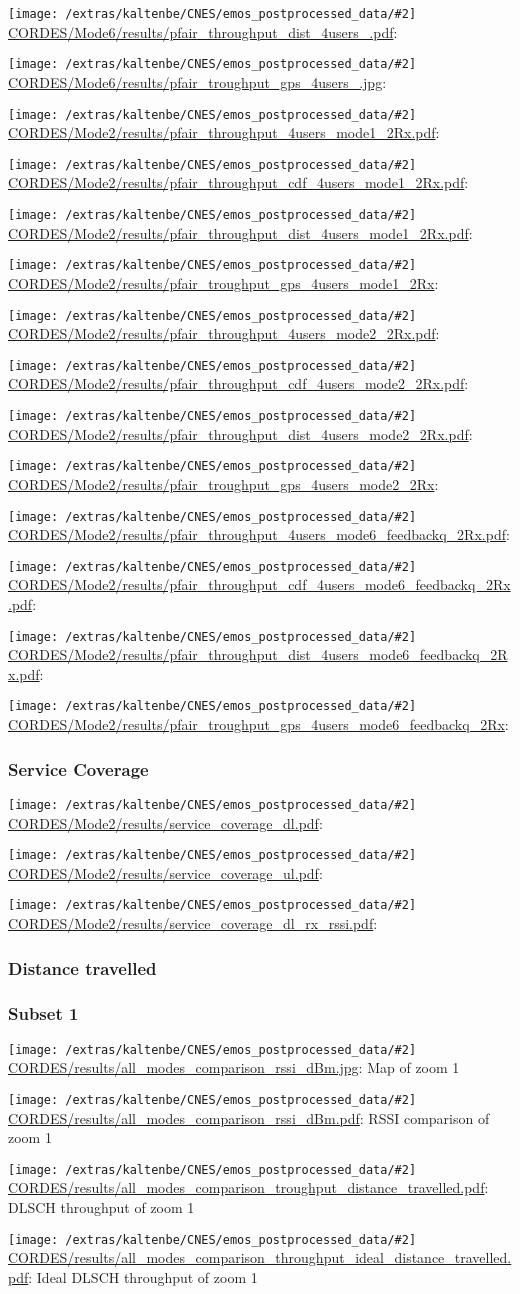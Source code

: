 \documentclass[a4paper,10pt]{article}
\newcommand{\printfile}[2][]{
 \begin{minipage}{8cm}
  \centering
  \texttt{[image: /extras/kaltenbe/CNES/emos\_postprocessed\_data/\#2]}
  \url{#2}: #1

 \end{minipage}
}
\begin{document}
\printfile{CORDES/Mode6/results/pfair_throughput_dist_4users_.pdf}
\printfile{CORDES/Mode6/results/pfair_troughput_gps_4users_.jpg}

\printfile{CORDES/Mode2/results/pfair_throughput_4users_mode1_2Rx.pdf}
\printfile{CORDES/Mode2/results/pfair_throughput_cdf_4users_mode1_2Rx.pdf}

\printfile{CORDES/Mode2/results/pfair_throughput_dist_4users_mode1_2Rx.pdf}
\printfile{CORDES/Mode2/results/pfair_troughput_gps_4users_mode1_2Rx}

\printfile{CORDES/Mode2/results/pfair_throughput_4users_mode2_2Rx.pdf}
\printfile{CORDES/Mode2/results/pfair_throughput_cdf_4users_mode2_2Rx.pdf}

\printfile{CORDES/Mode2/results/pfair_throughput_dist_4users_mode2_2Rx.pdf}
\printfile{CORDES/Mode2/results/pfair_troughput_gps_4users_mode2_2Rx}

\printfile{CORDES/Mode2/results/pfair_throughput_4users_mode6_feedbackq_2Rx.pdf}
\printfile{CORDES/Mode2/results/pfair_throughput_cdf_4users_mode6_feedbackq_2Rx.pdf}

\printfile{CORDES/Mode2/results/pfair_throughput_dist_4users_mode6_feedbackq_2Rx.pdf}
\printfile{CORDES/Mode2/results/pfair_troughput_gps_4users_mode6_feedbackq_2Rx}


\subsubsection{Service Coverage}

\printfile{CORDES/Mode2/results/service_coverage_dl.pdf}
\printfile{CORDES/Mode2/results/service_coverage_ul.pdf}

\printfile{CORDES/Mode2/results/service_coverage_dl_rx_rssi.pdf}

\subsubsection{Distance travelled}
\label{sec:dist_travelled_cordes}


\subsubsection*{Subset 1}

\printfile[Map of zoom 1]{CORDES/results/all_modes_comparison_rssi_dBm.jpg}
\printfile[RSSI comparison of zoom 1]{CORDES/results/all_modes_comparison_rssi_dBm.pdf}

\printfile[DLSCH throughput of zoom 1]{CORDES/results/all_modes_comparison_troughput_distance_travelled.pdf}
\printfile[Ideal DLSCH throughput of zoom 1]{CORDES/results/all_modes_comparison_throughput_ideal_distance_travelled.pdf}
\end{document}
